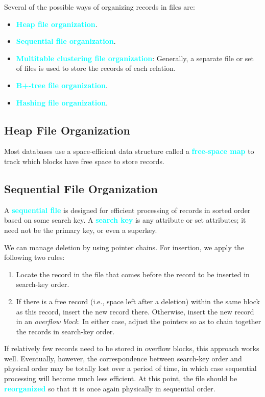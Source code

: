 \documentclass[a4paper,12pt,twoside,openany]{book}
\newcommand{\textcy}[1]{\textbf{\textcolor{cyan}{#1}}}
\begin{document}
Several of the possible ways of organizing records in files are:
\begin{itemize}
    \item \textcy{Heap file organization}.
    \item \textcy{Sequential file organization}.
    \item \textcy{Multitable clustering file organization}: Generally, a separate file or set of files is used to store the records of each relation.
    \item \textcy{B+-tree file organization}.
    \item \textcy{Hashing file organization}.
\end{itemize}

\subsection{Heap File Organization}

Most databases use a space-efficient data structure called a \textcy{free-space map} to track which blocks have free space to store records.

\subsection{Sequential File Organization}

A \textcy{sequential file} is designed for efficient processing of records in sorted order based on some search key. A \textcy{search key} is any attribute or set attributes; it need not be the primary key, or even a superkey.

We can manage deletion by using pointer chains. For insertion, we apply the following two rules:
\begin{enumerate}
    \item Locate the record in the file that comes before the record to be inserted in search-key order.
    \item If there is a free record (i.e., space left after a deletion) within the same block as this record, insert the new record there. Otherwise, insert the new record in an \textit{overflow block}. In either case, adjust the pointers so as to chain together the records in search-key order. 
\end{enumerate}

If relatively few records need to be stored in overflow blocks, this approach works well. Eventually, however, the correspondence between search-key order and physical order may be totally lost over a period of time, in which case sequential processing will become much less efficient. At this point, the file should be \textcy{reorganized} so that it is once again physically in sequential order.
\end{document}
